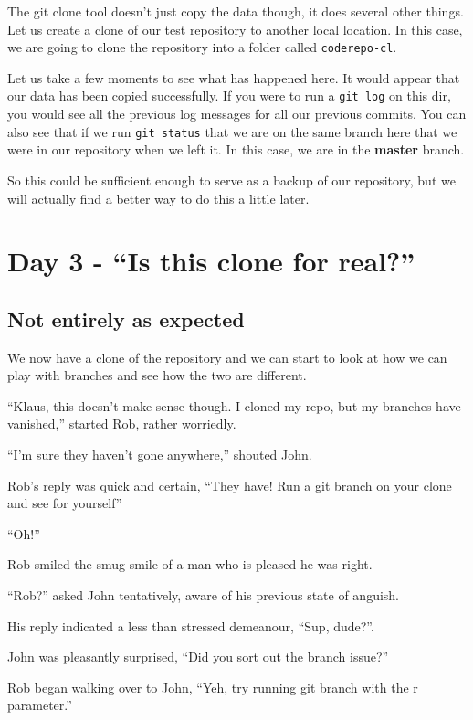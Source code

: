 The git clone tool doesn't just copy the data though, it does several other things.
Let us create a clone of our test repository to another local location.
In this case, we are going to clone the repository into a folder called \texttt{coderepo-cl}.


Let us take a few moments to see what has happened here.
It would appear that our data has been copied successfully.
If you were to run a \texttt{git log} on this dir, you would see all the previous log messages for all our previous commits.
You can also see that if we run \texttt{git status} that we are on the same branch here that we were in our repository when we left it.
In this case, we are in the \textbf{master} branch.

So this could be sufficient enough to serve as a backup of our repository, but we will actually find a better way to do this a little later.

\section{Day 3 - ``Is this clone for real?''}
\subsection{Not entirely as expected}
We now have a clone of the repository and we can start to look at how we can play with branches and see how the two are different.

\begin{trenches}
``Klaus, this doesn't make sense though. I cloned my repo, but my branches have vanished,'' started Rob, rather worriedly.

``I'm sure they haven't gone anywhere,'' shouted John.

Rob's reply was quick and certain, ``They have! Run a git branch on your clone and see for yourself''

``Oh!''

Rob smiled the smug smile of a man who is pleased he was right.

\thoughtbreak

``Rob?'' asked John tentatively, aware of his previous state of anguish.

His reply indicated a less than stressed demeanour, ``Sup, dude?''.

John was pleasantly surprised, ``Did you sort out the branch issue?''

Rob began walking over to John, ``Yeh, try running git branch with the r parameter.''

\end{trenches}

